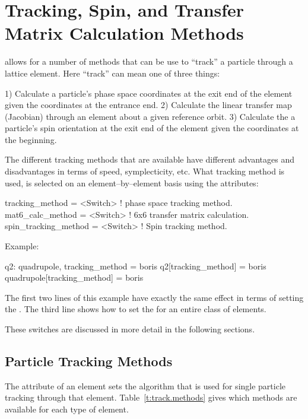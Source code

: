 \chapter{Tracking, Spin, and Transfer Matrix Calculation Methods}
\label{c:methods}

\bmad allows for a number of methods that can be use to ``track'' a particle
through a lattice element. Here ``track'' can mean one of three things:
\begin{example}
  1) Calculate a particle's phase space coordinates at the exit 
     end of the element given the coordinates at the entrance end.
  2) Calculate the linear transfer map (Jacobian) through an element
     about a given reference orbit.
  3) Calculate the a particle's spin orientation at the exit end 
     of the element given the coordinates at the beginning.
\end{example}
The different tracking methods that are available have different
advantages and disadvantages in terms of speed, symplecticity, etc.
What tracking method is used, is selected on an element--by--element
basis using the attributes:
\begin{example}
  tracking_method      = <Switch>   ! phase space tracking method.
  mat6_calc_method     = <Switch>   ! 6x6 transfer matrix calculation.
  spin_tracking_method = <Switch>   ! Spin tracking method.
\end{example}
Example:
\begin{example}
  q2: quadrupole, tracking_method = boris
  q2[tracking_method] = boris
  quadrupole[tracking_method] = boris
\end{example}
The first two lines of this example have exactly the same effect in
terms of setting the . The third line shows how to
set the  for an entire class of elements.

These switches are discussed in more detail in the following sections.

\section{Particle Tracking Methods}
\label{s:tkm}

The  attribute of an element sets the algorithm
that is used for single particle tracking through that element.
Table~\ref{t:track.methods} gives which methods are available for each
type of element.

